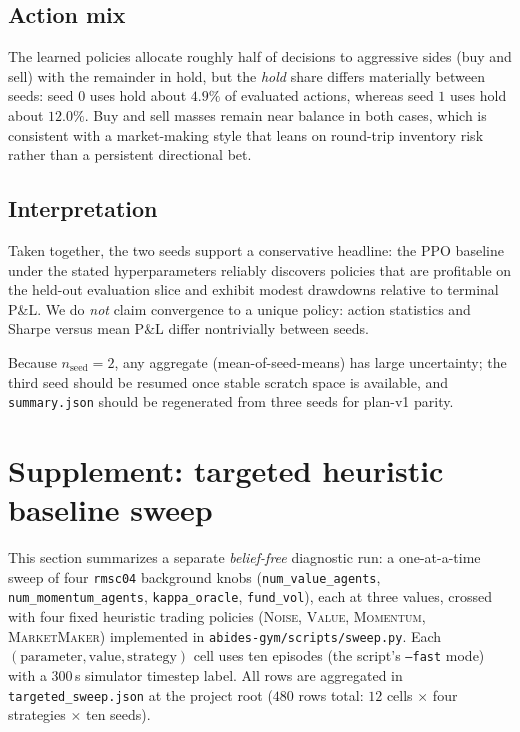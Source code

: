 \documentclass[11pt]{article}
\begin{document}
\subsection{Action mix}

The learned policies allocate roughly half of decisions to aggressive sides (buy and sell) with
the remainder in hold, but the \emph{hold} share differs materially between seeds: seed $0$ uses
hold about $4.9\%$ of evaluated actions, whereas seed $1$ uses hold about $12.0\%$. Buy and sell
masses remain near balance in both cases, which is consistent with a market-making style that
leans on round-trip inventory risk rather than a persistent directional bet.

\subsection{Interpretation}

Taken together, the two seeds support a conservative headline: the PPO baseline under the stated
hyperparameters reliably discovers policies that are profitable on the held-out evaluation slice
and exhibit modest drawdowns relative to terminal P\&L. We do \emph{not} claim convergence to a
unique policy: action statistics and Sharpe versus mean P\&L differ nontrivially between seeds.

Because $n_{\text{seed}} = 2$, any aggregate (mean-of-seed-means) has large uncertainty; the third
seed should be resumed once stable scratch space is available, and \texttt{summary.json} should be
regenerated from three seeds for plan-v1 parity.

\section{Supplement: targeted heuristic baseline sweep}

This section summarizes a separate \emph{belief-free} diagnostic run: a one-at-a-time sweep of four
\texttt{rmsc04} background knobs (\texttt{num\_value\_agents}, \texttt{num\_momentum\_agents},
\texttt{kappa\_oracle}, \texttt{fund\_vol}), each at three values, crossed with four fixed heuristic
trading policies (\textsc{Noise}, \textsc{Value}, \textsc{Momentum}, \textsc{MarketMaker}) implemented in
\texttt{abides-gym/scripts/sweep.py}. Each $(\text{parameter}, \text{value}, \text{strategy})$ cell uses
ten episodes (the script's \texttt{--fast} mode) with a $300$\,s simulator timestep label. All rows are
aggregated in \texttt{targeted\_sweep.json} at the project root ($480$ rows total: $12$ cells $\times$
four strategies $\times$ ten seeds).
\end{document}
